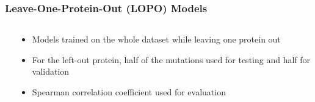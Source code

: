 \documentclass[10pt, british, luatex]{beamer}
\begin{document}
\begin{frame}
	\frametitle{Leave-One-Protein-Out (LOPO) Models}
	\begin{columns}[c]
		\begin{column}{.6\textwidth}
			\vfill\null%
			{%
				\centering%
				\let\bfseries\sbseries%
				
			}
		\end{column}
		\begin{column}{.4\textwidth}
			\vspace{-3em}
			\begin{itemize}
				\item Models trained on the whole dataset while leaving one protein out
				\item For the left-out protein, half of the mutations used for testing and half for validation
				\item Spearman correlation coefficient used for evaluation
			\end{itemize}
		\end{column}
	\end{columns}
\end{frame}
\end{document}

